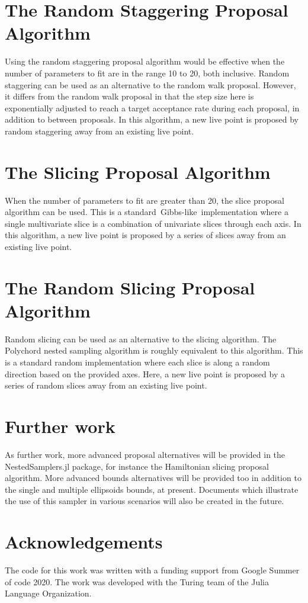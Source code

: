 \documentclass{juliacon}
\begin{document}
\section{The Random Staggering Proposal Algorithm}

Using the random staggering proposal algorithm would be effective when the number of parameters to fit are in the range 10 to 20, both inclusive. Random staggering can be used as an alternative to the random walk proposal. However, it differs from the random walk proposal in that the step size here is exponentially adjusted to reach a target acceptance rate during each proposal, in addition to between proposals. In this algorithm, a new live point is proposed by random staggering away from an existing live point.

\section{The Slicing Proposal Algorithm}

When the number of parameters to fit are greater than 20, the slice proposal algorithm can be used. This is a standard Gibbs-like implementation where a single multivariate slice is a combination of univariate slices through each axis. In this algorithm, a new live point is proposed by a series of slices away from an existing live point. 

\section{The Random Slicing Proposal Algorithm}

Random slicing can be used as an alternative to the slicing algorithm. The Polychord nested sampling algorithm is roughly equivalent to this algorithm. This is a standard random implementation where each slice is along a random direction based on the provided axes. Here, a new live point is proposed by a series of random slices away from an existing live point. 

\section{Further work}

As further work, more advanced proposal alternatives will be provided in the NestedSamplers.jl package, for instance the Hamiltonian slicing proposal algorithm. More advanced bounds alternatives will be provided too in addition to the single and multiple ellipsoids bounds, at present. Documents which illustrate the use of this sampler in various scenarios will also be created in the future.

\section*{Acknowledgements}
The code for this work was written with a funding support from Google Summer of code 2020. The work was developed with the Turing team of the Julia Language Organization.




\end{document}
